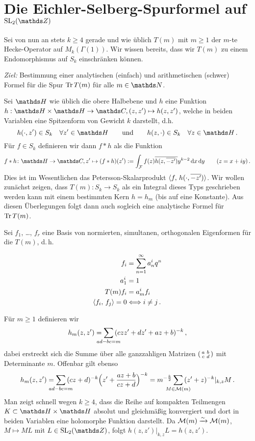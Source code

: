 \chapter{Die Eichler-Selberg-Spurformel auf \texorpdfstring{$\SL_2(\ZZ)$}{SL_2(Z)}}

Sei von nun an stets $k \geq 4$ gerade und wie üblich $T(m)$ mit $m \geq 1$ der $m$-te Hecke-Operator auf $M_k (\Gamma(1))$. Wir wissen bereits, dass wir $T(m)$ zu einem Endomorphismus auf $S_k$ einschränken können.

\emph{Ziel:} Bestimmung einer analytischen (einfach) und arithmetischen (schwer) Formel für die Spur $\operatorname{Tr} T(m)$ für alle $m \in \NN$.

Sei $\HH$ wie üblich die obere Halbebene und $h$ eine Funktion $h: \HH \times \HH \to \CC, (z, z') \mapsto h(z, z')$, welche in beiden Variablen eine Spitzenform von Gewicht $k$ darstellt, d.h. 
\[
	h(\cdot, z') \in S_k \quad \forall z' \in \HH \qquad \text{und} \qquad h(z, \cdot) \in S_k \quad \forall z \in \HH
	\,.
\]
Für $f \in S_k$ definieren wir dann $f \ast h$ als die Funktion
\begin{equation}\label{eq:faltungskern}
	f \ast h \colon \HH \to \CC, z' \mapsto (f \ast h)(z') := \int_{\mathcal F} f(z) \conj{ h(z, \conj{-z'})} y^{k-2} \opd x \opd y \qquad (z = x + iy)
	\,.
\end{equation}
Dies ist im Wesentlichen das Petersson-Skalarprodukt $\scalarprd f{h(\cdot, \conj{-z'})}$. Wir wollen zunächst zeigen, dass $T(m) \colon S_k \to S_k$ als ein Integral dieses Typs geschrieben werden kann mit einem bestimmten Kern $h = h_m$ (bis auf eine Konstante). Aus diesen Überlegungen folgt dann auch sogleich eine analytische Formel für $\operatorname{Tr} T(m)$.

Sei $f_1$, \ldots, $f_r$ eine Basis von normierten, simultanen, orthogonalen Eigenformen für die $T(m)$, d.\,h.

\begin{align*}
f_i &= \sum_{n=1}^\infty a_n^i q^n \\
a_1^i &= 1 \\
T(m)f_i &= a_m^if_i \\
\scalarprd {f_i}{f_j} = 0 &\Rla i \not= j
\,.
\end{align*}


Für $m \geq 1$ definieren wir
\[
h_m(z, z') = \smashoperator{\sum_{ad-bc=m}} \, (czz' + dz' + az + b)^{-k}
\,,
\]
dabei erstreckt sich die Summe über alle ganzzahligen Matrizen $\abcd$ mit Determinante $m$.
Offenbar gilt ebenso
\[
h_m(z,z') = \smashoperator{\sum_{ad-bc=m}} \, (cz+d)^{-k} \Bigl(z' + \frac{az+b}{cz+d}\Bigr)^{-k}
= m^{- \frac k2} \smashoperator{\sum_{M \in \mathcal{M}(m)}} \, (z'+z)^{-k}|_{k,z} M
\,.
\]
Man zeigt schnell wegen $k \geq 4$, dass die Reihe auf kompakten Teilmengen $K \subset \HH \times \HH$ absolut und gleichmäßig konvergiert und dort in beiden Variablen eine holomorphe Funktion darstellt.
Da $\mathcal{M}(m) \xrightarrow{\sim} \mathcal{M}(m)$, $M \mapsto ML$ mit $L \in \SL_2(\ZZ)$,
folgt $h(z,z')|_{k,z} L = h(z, z')$.


